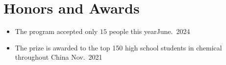 \section{Honors and Awards}
\begin{itemize}
      \item {}
            {The program accepted only $15$ people this year}{June.\ 2024}

      \item {}
            {The prize is awarded to the top 150 high school students in chemical throughout China }{Nov.\ 2021}
\end{itemize}